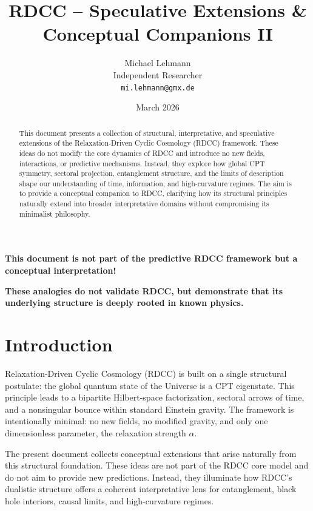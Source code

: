 \documentclass[11pt,a4paper]{article}
\title{\textbf{RDCC – Speculative Extensions \& Conceptual Companions II}}
\author{Michael Lehmann \\
        Independent Researcher \\
        \texttt{mi.lehmann@gmx.de}}
\date{March 2026}
\begin{document}
\maketitle
\vspace{1em}
\begin{center}

\textbf{This document is not part of the predictive RDCC framework but a conceptual interpretation!}

\vspace{1em}

\textbf{These analogies do not validate RDCC, but demonstrate that its underlying structure is deeply rooted in known physics.}
\end{center}
\vspace{1em}

\begin{abstract}
This document presents a collection of structural, interpretative, and speculative extensions of the Relaxation-Driven Cyclic Cosmology (RDCC) framework. These ideas do not modify the core dynamics of RDCC and introduce no new fields, interactions, or predictive mechanisms. Instead, they explore how global CPT symmetry, sectoral projection, entanglement structure, and the limits of description shape our understanding of time, information, and high-curvature regimes. The aim is to provide a conceptual companion to RDCC, clarifying how its structural principles naturally extend into broader interpretative domains without compromising its minimalist philosophy.
\end{abstract}

\section{Introduction}

Relaxation-Driven Cyclic Cosmology (RDCC) is built on a single structural postulate: the global quantum state of the Universe is a CPT eigenstate. This principle leads to a bipartite Hilbert-space factorization, sectoral arrows of time, and a nonsingular bounce within standard Einstein gravity. The framework is intentionally minimal: no new fields, no modified gravity, and only one dimensionless parameter, the relaxation strength $\alpha$.

The present document collects conceptual extensions that arise naturally from this structural foundation. These ideas are not part of the RDCC core model and do not aim to provide new predictions. Instead, they illuminate how RDCC's dualistic structure offers a coherent interpretative lens for entanglement, black hole interiors, causal limits, and high-curvature regimes.
\end{document}
